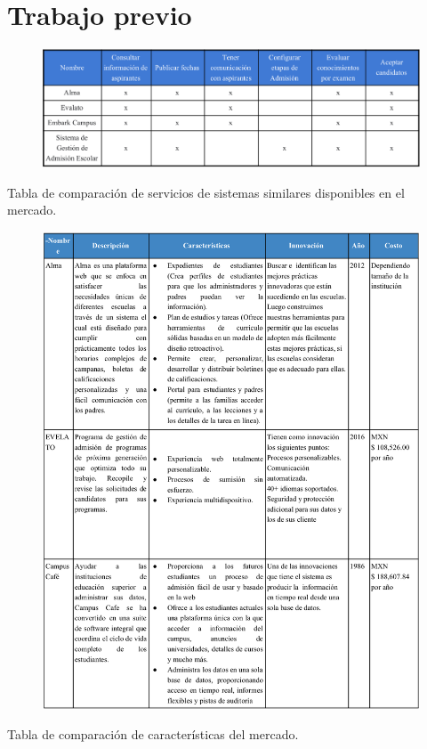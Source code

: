 \clearpage
\section{Trabajo previo}
\begin{table}[htbp!]
  \begin{center}
    \begin{figure}[H]
        \centering
        \includegraphics[width=1\textwidth]{imagenes/introduccion/tablaservicios}
    \end{figure}
    \caption{Tabla de comparación de servicios de sistemas similares disponibles en el mercado.}
    \label{tab:table1}
  \end{center}
\end{table}
\clearpage
\begin{table}[htbp!]
  \begin{center}
    \begin{figure}[H]
        \centering
        \includegraphics[width=1\textwidth]{imagenes/introduccion/tablacaracteristicas}
    \end{figure}
    \caption{Tabla de comparación de características del mercado.}
    \label{tab:table2}
  \end{center}
\end{table}

